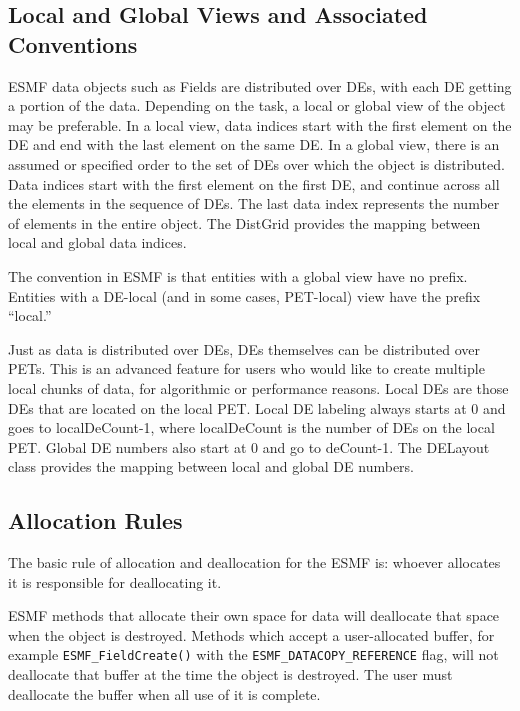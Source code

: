 \subsection{Local and Global Views and Associated Conventions}

ESMF data objects such as Fields are distributed over
DEs, with each DE getting a portion of the data.  Depending
on the task, a local or global view of the object may be
preferable.  In a local view, data indices start with the first
element on the DE and end with the last element on the same DE.
In a global view, there is an assumed or specified order to
the set of DEs over which the object is distributed.  Data
indices start with the first element on the first DE, and
continue across all the elements in the sequence of DEs.
The last data index represents the number of elements in the
entire object.  The DistGrid provides the mapping between
local and global data indices.

The convention in ESMF is that entities with a global view
have no prefix.  Entities with a DE-local (and in some cases,
PET-local) view have the prefix ``local.''

Just as data is distributed over DEs, DEs themselves can be
distributed over PETs.  This is an advanced feature for users
who would like to create multiple local chunks of data, for
algorithmic or performance reasons.
Local DEs are those DEs that are located on the local PET.
Local DE labeling always starts at 0 and goes to localDeCount-1,
where localDeCount is the number of DEs on the local PET.
Global DE numbers also start at 0 and go to deCount-1.
The DELayout class provides the mapping between local
and global DE numbers. 

\subsection{Allocation Rules}

The basic rule of allocation and deallocation for the ESMF is:
whoever allocates it is responsible for deallocating it.

\begin{sloppypar}
ESMF methods that allocate their own space for data will
deallocate that space when the object is destroyed. 
Methods which accept a user-allocated buffer, for example
{\tt ESMF\_FieldCreate()} with the {\tt ESMF\_DATACOPY\_REFERENCE} flag,
will not deallocate that buffer at the time the object is
destroyed.  The user must deallocate the buffer
when all use of it is complete.
\end{sloppypar}

